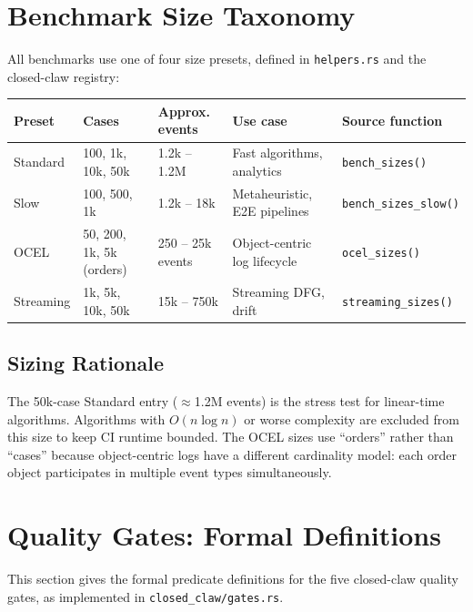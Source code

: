 \documentclass[11pt,a4paper]{article}
\begin{document}
\section{Benchmark Size Taxonomy}
\label{sec:sizetaxonomy}

All benchmarks use one of four size presets, defined in \texttt{helpers.rs}
and the closed-claw registry:

\begin{center}
\begin{tabular}{@{}lllll@{}}
\toprule
\textbf{Preset} & \textbf{Cases} & \textbf{Approx. events} &
\textbf{Use case} & \textbf{Source function} \\
\midrule
Standard  & 100, 1k, 10k, 50k  & 1.2k -- 1.2M  &
  Fast algorithms, analytics & \texttt{bench\_sizes()} \\
Slow      & 100, 500, 1k       & 1.2k -- 18k   &
  Metaheuristic, E2E pipelines & \texttt{bench\_sizes\_slow()} \\
OCEL      & 50, 200, 1k, 5k (orders) & 250 -- 25k events &
  Object-centric log lifecycle & \texttt{ocel\_sizes()} \\
Streaming & 1k, 5k, 10k, 50k  & 15k -- 750k   &
  Streaming DFG, drift & \texttt{streaming\_sizes()} \\
\bottomrule
\end{tabular}
\end{center}

\subsection{Sizing Rationale}

The 50k-case Standard entry ($\approx$1.2M events) is the stress test for
linear-time algorithms. Algorithms with $O(n \log n)$ or worse complexity
are excluded from this size to keep CI runtime bounded. The OCEL sizes use
``orders'' rather than ``cases'' because object-centric logs have a
different cardinality model: each order object participates in multiple
event types simultaneously.

\section{Quality Gates: Formal Definitions}
\label{sec:qualitygates}

This section gives the formal predicate definitions for the five closed-claw
quality gates, as implemented in \texttt{closed\_claw/gates.rs}.
\end{document}
